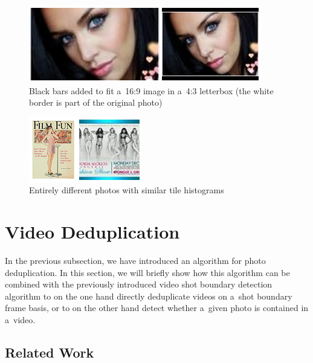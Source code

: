\begin{figure}[h!]
  \centering
  \includegraphics[width=0.55\linewidth]{./bwtolerance.png}
  \caption[Black bars added to fit a~16:9 image in a~4:3 letterbox]
    {Black bars added to fit a~16:9 image in a~4:3 letterbox
    (the white border is part of the original photo)}
  \label{fig:bwtolerance}
\end{figure}

\begin{figure}[h!]
  \centering
  \includegraphics[width=0.4\linewidth]{./weakness.png}
  \caption{Entirely different photos with similar tile histograms}
  \label{fig:weakness}
\end{figure}

\section{Video Deduplication}

In the previous subsection, we have introduced
an algorithm for photo deduplication.
In this section, we will briefly show how this algorithm
can be combined with the previously introduced
video shot boundary detection algorithm to on the one hand
directly deduplicate videos on a~shot boundary frame basis,
or to on the other hand detect
whether a~given photo is contained in a~video.

\subsection{Related Work}

